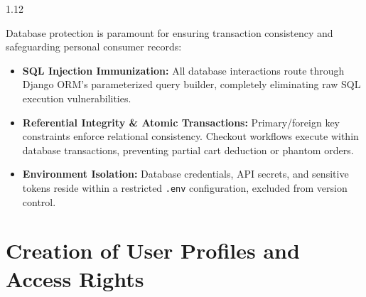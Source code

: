 \documentclass[12pt,a4paper]{article}
\begin{document}
{\fontsize{12.5}{17}\selectfont
\begin{spacing}{1.12}

\noindent
Database protection is paramount for ensuring transaction consistency and safeguarding personal consumer records:
\begin{itemize}
    \setlength{\itemsep}{1.5pt}
    \item \textbf{SQL Injection Immunization:} All database interactions route through Django ORM's parameterized query builder, completely eliminating raw SQL execution vulnerabilities.
    \item \textbf{Referential Integrity \& Atomic Transactions:} Primary/foreign key constraints enforce relational consistency. Checkout workflows execute within database transactions, preventing partial cart deduction or phantom orders.
    \item \textbf{Environment Isolation:} Database credentials, API secrets, and sensitive tokens reside within a restricted \texttt{.env} configuration, excluded from version control.
\end{itemize}

\end{spacing}
}

\vspace{0.10in}


\section{Creation of User Profiles and Access Rights}

\vspace{0.06in}
\end{document}
